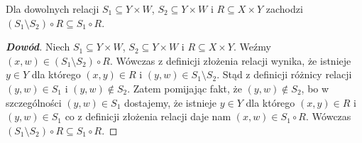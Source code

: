 \begin{property}
Dla dowolnych relacji $S_{1}\subseteq Y\times W$, $S_{2}\subseteq Y\times W$ i $R\subseteq X\times Y$ zachodzi $(S_{1}\setminus S_{2})\circ R\subseteq S_{1}\circ R$.
\end{property}
\begin{proof}[\textbf{Dowód}]
Niech $S_{1}\subseteq Y\times W$, $S_{2}\subseteq Y\times W$ i $R\subseteq X\times Y$. Weźmy $(x,w)\in(S_{1}\setminus S_{2})\circ R$. Wówczas z definicji złożenia relacji wynika, że istnieje $y\in Y$ dla którego $(x,y)\in R$ i $(y,w)\in S_{1}\setminus S_{2}$. Stąd z definicji różnicy relacji $(y,w)\in S_{1}$ i $(y,w)\notin S_{2}$. Zatem pomijając fakt, że $(y,w)\notin S_{2}$, bo w szczególności $(y,w)\in S_{1}$ dostajemy, że istnieje $y\in Y$ dla którego $(x,y)\in R$ i $(y,w)\in S_{1}$ co z definicji złożenia relacji daje nam $(x,w)\in S_{1}\circ R$. Wówczas $(S_{1}\setminus S_{2})\circ R\subseteq S_{1}\circ R$.
\end{proof}
